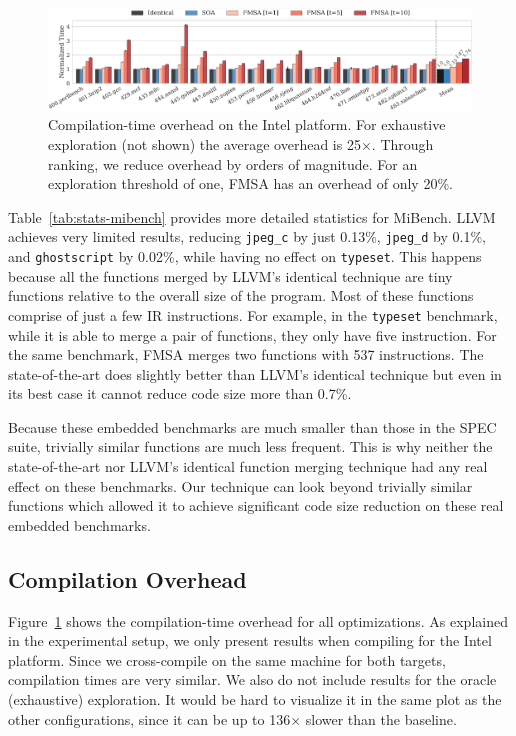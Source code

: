 \begin{figure}[t]
  \centering
  \includegraphics[width=\linewidth]{figs/compilation-time.pdf}
	\caption{Compilation-time overhead on the Intel platform. For exhaustive exploration (not shown) the average overhead is 25$\times$. Through ranking, we reduce overhead by orders of magnitude. For an exploration threshold of one, FMSA has an overhead of only 20\%.}
  \label{fig:compilation-time}
\end{figure}

Table~\ref{tab:stats-mibench} provides more detailed statistics for MiBench.
LLVM achieves very limited results, reducing \texttt{jpeg\_c} by just 0.13\%,
\texttt{jpeg\_d} by 0.1\%, and \texttt{ghostscript} by 0.02\%, while having no effect on \texttt{typeset}.
This happens because all the functions merged by LLVM's identical technique are tiny functions relative to the overall size of the program.
Most of these functions comprise of just a few IR instructions. For example, in the \texttt{typeset} benchmark,
while it is able to merge a pair of functions, they only have five instruction. For the same benchmark, FMSA merges two functions with 537 instructions.
The state-of-the-art does slightly better than LLVM's identical technique but even in its best case it cannot reduce code size more than 0.7\%.

Because these embedded benchmarks are much smaller than those in the SPEC suite, trivially similar functions are much less frequent.
This is why neither the state-of-the-art nor LLVM's identical function merging technique had any real effect on these benchmarks.
Our technique can look beyond trivially similar functions which allowed it to achieve significant code size reduction on these real embedded benchmarks.

\subsection{Compilation Overhead}

Figure~\ref{fig:compilation-time} shows the compilation-time overhead for all optimizations. As explained in the experimental setup, we
only present results when compiling for the Intel platform. Since we cross-compile on the same machine for both targets, compilation times
are very similar. We also do not include results for the oracle (exhaustive) exploration. It would be hard to visualize it in the same plot
as the other configurations, since it can be up to 136$\times$ slower than the baseline.

